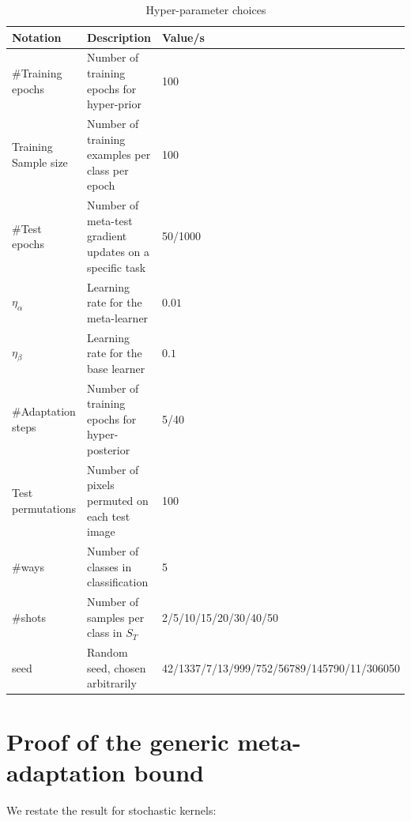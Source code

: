 \documentclass[letterpaper]{article} %
\theoremstyle{definition}
\begin{document}
\begin{table}[t]	
	
	\centering
	\begin{tabular}{lll}
		\toprule
		Notation   & Description  & Value/s   \\
		\midrule
		\#Training epochs & Number of training epochs for hyper-prior   & 100      \\
		\midrule
		Training Sample size & Number of training examples per class per epoch   & 100      \\
		\midrule
		\#Test epochs & Number of meta-test gradient updates on a specific task   & 50/1000      \\
		\midrule
		$\eta_{\alpha}$  & Learning rate for the meta-learner   & $0.01$      \\
		\midrule
		$\eta_{\beta}$  & Learning rate for the base learner   & $0.1$      \\
		\midrule
		\#Adaptation steps  & Number of training epochs for hyper-posterior   & 5/40      \\
		\midrule
		Test permutations  & Number of pixels permuted on each test image   & 100      \\
		\midrule
		\#ways & Number of classes in classification & 5\\
		\midrule
		\#shots & Number of samples per class in $S_T$ & 2/5/10/15/20/30/40/50\\
		\midrule
		seed & Random seed, chosen arbitrarily & 42/1337/7/13/999/752/56789/145790/11/306050\\
		\bottomrule
	\end{tabular}
	\caption{Hyper-parameter choices}
	\label{table:hyper-params}
\end{table}


\section{Proof of the generic meta-adaptation bound} \label{append:proof-main-result}

We restate the result for stochastic kernels:
\end{document}
